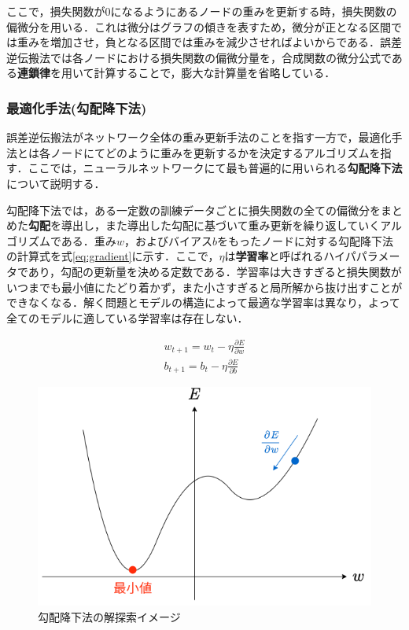 \documentclass[a4j, 11pt]{jreport}
\begin{document}
ここで，損失関数が0になるようにあるノードの重みを更新する時，損失関数の偏微分を用いる．これは微分はグラフの傾きを表すため，微分が正となる区間では重みを増加させ，負となる区間では重みを減少させればよいからである．誤差逆伝搬法では各ノードにおける損失関数の偏微分量を，合成関数の微分公式である\textbf{連鎖律}を用いて計算することで，膨大な計算量を省略している．
\subsubsection{最適化手法(勾配降下法)}
誤差逆伝搬法がネットワーク全体の重み更新手法のことを指す一方で，最適化手法とは各ノードにてどのように重みを更新するかを決定するアルゴリズムを指す．ここでは，ニューラルネットワークにて最も普遍的に用いられる\textbf{勾配降下法}について説明する．

勾配降下法では，ある一定数の訓練データごとに損失関数の全ての偏微分をまとめた\textbf{勾配}を導出し，また導出した勾配に基づいて重み更新を繰り返していくアルゴリズムである．重み$w$，およびバイアス$b$をもったノードに対する勾配降下法の計算式を式\ref{eq:gradient}に示す．ここで，$\eta$は\textbf{学習率}と呼ばれるハイパパラメータであり，勾配の更新量を決める定数である．学習率は大きすぎると損失関数がいつまでも最小値にたどり着かず，また小さすぎると局所解から抜け出すことができなくなる．解く問題とモデルの構造によって最適な学習率は異なり，よって全てのモデルに適している学習率は存在しない．

\begin{equation}
  \begin{array}{l}
    w_{t+1} = w_t - \eta \frac{\partial E}{\partial w} \\
    b_{t+1} = b_t - \eta \frac{\partial E}{\partial b}
  \end{array}
  \label{eq:gradient}
\end{equation}

\begin{figure}[H]
 \centering
 \includegraphics[width=0.7\hsize, keepaspectratio]{images/drawio/gradient.png}
 \caption{勾配降下法の解探索イメージ}
 \label{fig:gradient}
\end{figure}
\end{document}
